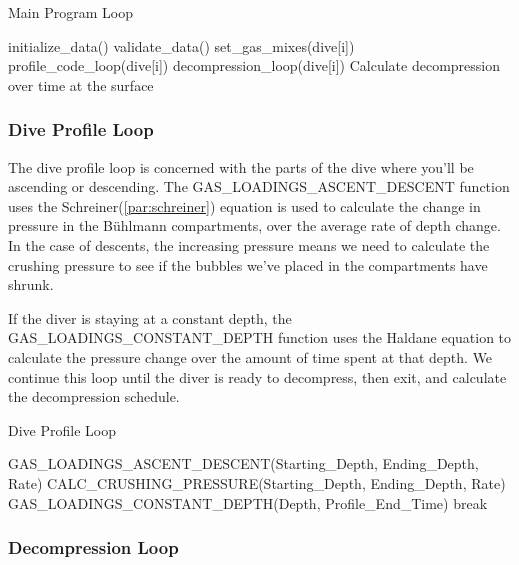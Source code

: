 \documentclass[12pt]{article}
\begin{document}
\begin{algorithm}
\caption{Main Program Loop}
\label{pre1}
\begin{algorithmic}
\STATE initialize\_data()
\STATE validate\_data()
\STATE set\_gas\_mixes(dive[i])
\STATE profile\_code\_loop(dive[i])
\STATE decompression\_loop(dive[i])
\STATE Calculate decompression over time at the surface
\ENDIF
\ENDFOR
\end{algorithmic}
\end{algorithm}

\subsubsection{Dive Profile Loop}

The dive profile loop is concerned with the parts of the dive where you'll be ascending or descending.
The GAS\_LOADINGS\_ASCENT\_DESCENT function uses the Schreiner(\ref{par:schreiner}) equation is used to calculate the change in pressure in the B\"uhlmann compartments, over the average rate of depth change. In the case of descents, the
increasing pressure means we need to calculate the crushing pressure to see if the bubbles we've placed in the
compartments have shrunk.

If the diver is staying at a constant depth, the GAS\_LOADINGS\_CONSTANT\_DEPTH function uses the
Haldane equation to calculate the pressure change over the amount of time spent at that depth. We continue this
loop until the diver is ready to decompress, then exit, and calculate the decompression schedule.

\begin{algorithm}
\caption{Dive Profile Loop}
\label{pre2}
\begin{algorithmic}
\STATE GAS\_LOADINGS\_ASCENT\_DESCENT(Starting\_Depth, Ending\_Depth, Rate)
\STATE CALC\_CRUSHING\_PRESSURE(Starting\_Depth, Ending\_Depth, Rate)
\ENDIF
{}
\STATE GAS\_LOADINGS\_CONSTANT\_DEPTH(Depth, Profile\_End\_Time)
\ELSE
\STATE break
\ENDIF
\ENDFOR
\end{algorithmic}
\end{algorithm}

\subsubsection{Decompression Loop}
\end{document}
